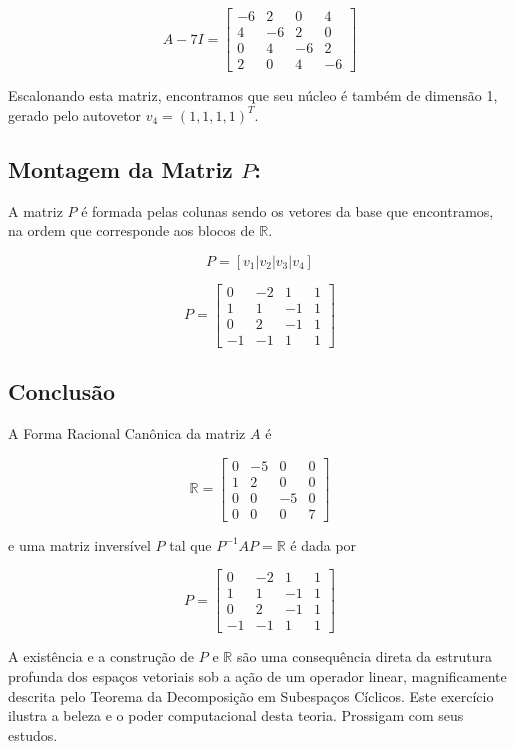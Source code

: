 \[
A-7I =
\begin{bmatrix}
-6 & 2 & 0 & 4 \\
4 & -6 & 2 & 0 \\
0 & 4 & -6 & 2 \\
2 & 0 & 4 & -6
\end{bmatrix}
\]

Escalonando esta matriz, encontramos que seu núcleo é também de dimensão 1, gerado pelo
autovetor $v_4=(1,1,1,1)^T$.

\subsection*{Montagem da Matriz $P$:}

A matriz $P$ é formada pelas colunas sendo os vetores da base que encontramos, na ordem que
corresponde aos blocos de $\mathbb{R}$.

\[
P = [v_1|v_2|v_3|v_4]
\]

\[
P =
\begin{bmatrix}
0 & -2 & 1 & 1 \\
1 & 1 & -1 & 1 \\
0 & 2 & -1 & 1 \\
-1 & -1 & 1 & 1
\end{bmatrix}
\]

\subsection*{Conclusão}

A Forma Racional Canônica da matriz $A$ é

\[
\mathbb{R} =
\begin{bmatrix}
0 & -5 & 0 & 0 \\
1 & 2 & 0 & 0 \\
0 & 0 & -5 & 0 \\
0 & 0 & 0 & 7
\end{bmatrix}
\]

e uma matriz inversível $P$ tal que $P^{-1}AP=\mathbb{R}$ é dada por

\[
P =
\begin{bmatrix}
0 & -2 & 1 & 1 \\
1 & 1 & -1 & 1 \\
0 & 2 & -1 & 1 \\
-1 & -1 & 1 & 1
\end{bmatrix}
\]

A existência e a construção de $P$ e $\mathbb{R}$ são uma consequência direta da estrutura profunda dos
espaços vetoriais sob a ação de um operador linear, magnificamente descrita pelo Teorema da
Decomposição em Subespaços Cíclicos. Este exercício ilustra a beleza e o poder computacional
desta teoria. Prossigam com seus estudos.